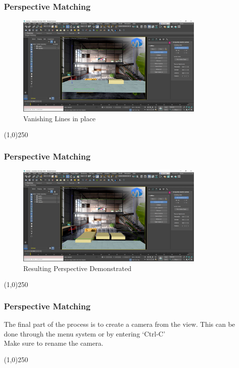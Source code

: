 \begin{frame}
	\frametitle{Perspective Matching}
	\begin{figure}
		\centering
		\includegraphics[height=5cm]{./img/PerspectiveMatching/6.jpg}
		\caption[Vanishing Lines in place]{Vanishing Lines in place}
		\label{fig:PerspectiveMatch6}
	\end{figure}
\end{frame}
\begin{center}\line(1,0){250}\end{center}



\begin{frame}
	\frametitle{Perspective Matching}
	\begin{figure}
		\centering
		\includegraphics[height=5cm]{./img/PerspectiveMatching/7.jpg}
		\caption[Resulting Perspective Demonstrated]{Resulting Perspective Demonstrated}
		\label{fig:PerspectiveMatch7}
	\end{figure}
\end{frame}
\begin{center}\line(1,0){250}\end{center}


\begin{frame}
	\frametitle{Perspective Matching}
	The final part of the process is to create a camera from the view.  This can be done through the menu system or by entering `Ctrl-C'\\
	Make sure to rename the camera.
	
\end{frame}
\begin{center}\line(1,0){250}\end{center}




